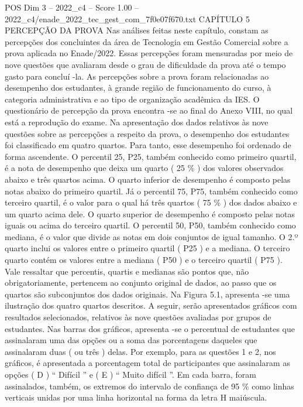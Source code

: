 \begin{textsample}{POS Dim 3 – 2022\_c4 – Score 1.00 – 2022\_c4/enade\_2022\_tec\_gest\_com\_7f0e07f670.txt}  \label{ex:f3_pos_177}
CAPÍTULO 5 PERCEPÇÃO DA PROVA Nas análises feitas neste capítulo, constam as percepções dos concluintes da área de Tecnologia em Gestão Comercial sobre a prova aplicada no Enade/2022.
Essas percepções foram mensuradas por meio de nove questões que avaliaram desde o grau de dificuldade da prova até o tempo gasto para concluí -la.
As percepções sobre a prova foram relacionadas ao desempenho dos estudantes, à grande região de funcionamento do curso, à categoria administrativa e ao tipo de organização acadêmica da IES.
O questionário de percepção da prova encontra -se ao final do Anexo VIII, no qual está a reprodução do exame.
Na apresentação dos dados relativos às nove questões sobre as percepções a respeito da prova, o desempenho dos estudantes foi classificado em quatro quartos.
Para tanto, esse desempenho foi ordenado de forma ascendente.
O percentil 25, P25, também conhecido como primeiro quartil, é a nota de desempenho que deixa um quarto ( 25 \% ) dos valores observados abaixo e três quartos acima.
O quarto inferior de desempenho é composto pelas notas abaixo do primeiro quartil.
Já o percentil 75, P75, também conhecido como terceiro quartil, é o valor para o qual há três quartos ( 75 \% ) dos dados abaixo e um quarto acima dele.
O quarto superior de desempenho é composto pelas notas iguais ou acima do terceiro quartil.
O percentil 50, P50, também conhecido como mediana, é o valor que divide as notas em dois conjuntos de igual tamanho.
O 2.º quarto inclui os valores entre o primeiro quartil ( P25 ) e a mediana.
O terceiro quarto contém os valores entre a mediana ( P50 ) e o terceiro quartil ( P75 ).
Vale ressaltar que percentis, quartis e medianas são pontos que, não obrigatoriamente, pertencem ao conjunto original de dados, ao passo que os quartos são subconjuntos dos dados originais.
Na Figura 5.1, apresenta -se uma ilustração dos quatro quartos descritos.
A seguir, serão apresentados gráficos com resultados selecionados, relativos às nove questões avaliadas por grupos de estudantes.
Nas barras dos gráficos, apresenta -se o percentual de estudantes que assinalaram uma das opções ou a soma das porcentagens daqueles que assinalaram duas ( ou três ) delas.
Por exemplo, para as questões 1 e 2, nos gráficos, é apresentada a porcentagem total de participantes que assinalaram as opções ( D ) “ Difícil ” e ( E ) “ Muito difícil ”.
Em cada barra, foram assinalados, também, os extremos do intervalo de confiança de 95 \% como linhas verticais unidas por uma linha horizontal na forma da letra H maiúscula.

\end{textsample}
